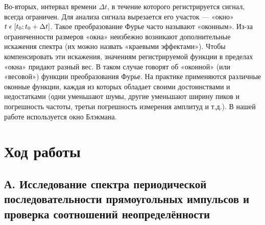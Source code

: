 \documentclass[a4paper,12pt]{article}
\begin{document}
Во-вторых, интервал времени $\Delta t$, в течение которого регистрируется сигнал, всегда ограничен. Для анализа сигнала вырезается его участок — «окно» $t \hspace{1mm} \epsilon  \hspace{1mm} [t_0; t_0 + \Delta t]$. Такое преобразование Фурье часто называют «оконным». Из-за ограниченности размеров «окна» неизбежно возникают дополнительные искажения спектра (их можно назвать «краевыми эффектами»). Чтобы компенсировать эти искажения, значениям регистрируемой функции в пределах «окна» придают разный вес. В таком случае говорят об «оконной» (или «весовой») функции преобразования Фурье. На практике применяются различные оконные функции, каждая из которых обладает своими достоинствами и недостатками (одни уменьшают шумы, другие уменьшают ширину пиков и погрешность частоты, третьи погрешность измерения амплитуд и т.д.). В нашей работе используется окно Блэкмана.

\section*{Ход работы}

\subsection*{А. Исследование спектра периодической последовательности прямоугольных импульсов и проверка соотношений неопределённости}
\end{document}

